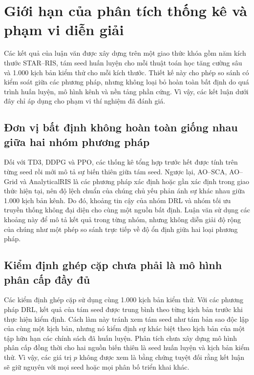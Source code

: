 
\section{Giới hạn của phân tích thống kê và phạm vi diễn giải}
\label{sec:statistical-limitations}

Các kết quả của luận văn được xây dựng trên một giao thức khóa gồm năm kích thước STAR--RIS, tám seed huấn luyện cho mỗi thuật toán học tăng cường sâu và 1.000 kịch bản kiểm thử cho mỗi kích thước. Thiết kế này cho phép so sánh có kiểm soát giữa các phương pháp, nhưng không loại bỏ hoàn toàn bất định do quá trình huấn luyện, mô hình kênh và nền tảng phần cứng. Vì vậy, các kết luận dưới đây chỉ áp dụng cho phạm vi thí nghiệm đã đánh giá.

\subsection{Đơn vị bất định không hoàn toàn giống nhau giữa hai nhóm phương pháp}

Đối với TD3, DDPG và PPO, các thống kê tổng hợp trước hết được tính trên từng seed rồi mới mô tả sự biến thiên giữa tám seed. Ngược lại, AO--SCA, AO--Grid và AnalyticalRIS là các phương pháp xác định hoặc gần xác định trong giao thức hiện tại, nên độ lệch chuẩn của chúng chủ yếu phản ánh sự khác nhau giữa 1.000 kịch bản kênh. Do đó, khoảng tin cậy của nhóm DRL và nhóm tối ưu truyền thống không đại diện cho cùng một nguồn bất định. Luận văn sử dụng các khoảng này để mô tả kết quả trong từng nhóm, nhưng không diễn giải độ rộng của chúng như một phép so sánh trực tiếp về độ ổn định giữa hai loại phương pháp.

\subsection{Kiểm định ghép cặp chưa phải là mô hình phân cấp đầy đủ}

Các kiểm định ghép cặp sử dụng cùng 1.000 kịch bản kiểm thử. Với các phương pháp DRL, kết quả của tám seed được trung bình theo từng kịch bản trước khi thực hiện kiểm định. Cách làm này tránh xem tám seed như tám bản sao độc lập của cùng một kịch bản, nhưng nó kiểm định sự khác biệt theo kịch bản của một tập hữu hạn các chính sách đã huấn luyện. Phân tích chưa xây dựng mô hình phân cấp đồng thời cho hai nguồn biến thiên là seed huấn luyện và kịch bản kiểm thử. Vì vậy, các giá trị $p$ không được xem là bằng chứng tuyệt đối rằng kết luận sẽ giữ nguyên với mọi seed hoặc mọi phân bố triển khai khác.

